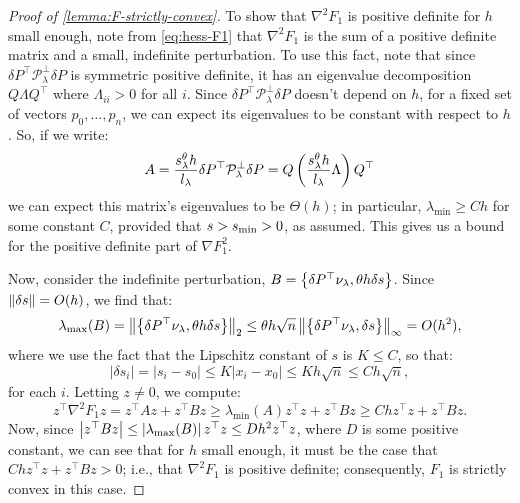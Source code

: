 \documentclass[eikonal.tex]{subfiles}
\begin{document}
\begin{proof}[Proof of \cref{lemma:F-strictly-convex}]
  To show that $\nabla^2 F_1$ is positive definite for $h$ small
  enough, note from \cref{eq:hess-F1} that $\nabla^2 F_1$ is the sum
  of a positive definite matrix and a small, indefinite
  perturbation. To use this fact, note that since
  $\delta P^\top \mathcal{P}^\perp_\lambda \delta P$ is symmetric
  positive definite, it has an eigenvalue decomposition
  $Q \Lambda Q^\top$ where $\Lambda_{ii} > 0$ for all $i$. Since
  $\delta P^\top \mathcal{P}^\perp_\lambda \delta P$ doesn't depend on
  $h$, for a fixed set of vectors $p_0, \hdots, p_n$, we can expect
  its eigenvalues to be constant with respect to $h$. So, if we write:
  \begin{equation}
    A = \frac{s^\theta_\lambda h}{l_\lambda} \delta P^\top \mathcal{P}^\perp_\lambda \delta P = Q \left(\frac{s^\theta_\lambda h}{l_\lambda} \Lambda\right) Q^\top
  \end{equation}
  we can expect this matrix's eigenvalues to be $\Theta(h)$; in
  particular, $\lambda_{\min} \geq C h$ for some constant $C$,
  provided that $s > s_{\operatorname{min}} > 0$, as assumed. This gives us a bound for
  the positive definite part of $\nabla F_1^2$.

  Now, consider the indefinite perturbation,
  $B = \left\{\delta P^\top \nu_\lambda, \theta h \delta s\right\}$. Since
  $\left\|\delta s\right\| = O(h)$, we find that:
  \begin{equation}
    \lambda_{\max}(B) = \left\|\left\{\delta P^\top \nu_\lambda,
        \theta h \delta s\right\}\right\|_2 \leq \theta h \sqrt{n} \left\|\left\{\delta P^\top \nu_\lambda, \delta s\right\}\right\|_\infty = O(h^2),
  \end{equation}
  where we use the fact that the Lipschitz constant of $s$ is
  $K \leq C$, so that:
  \begin{equation}
    |\delta s_i| = |s_i - s_0| \leq K |x_i - x_0| \leq K h \sqrt{n}
    \leq Ch \sqrt{n},
  \end{equation}
  for each $i$. Letting $z \neq 0$, we compute:
  \begin{equation}
    z^\top \nabla^2 F_1 z = z^\top A z + z^\top B z \geq \lambda_{\min}(A) z^\top z + z^\top B z \geq Ch z^\top z + z^\top B z.
  \end{equation}
  Now, since
  $\left|z^\top B z\right| \leq \left|\lambda_{\max}(B)\right| z^\top z \leq D h^2
  z^\top z$, where $D$ is some positive constant, we can see that for
  $h$ small enough, it must be the case that
  $Ch z^\top z + z^\top B z > 0$; i.e., that $\nabla^2 F_1$ is
  positive definite; consequently, $F_1$ is strictly convex in this case.
\end{proof}
\end{document}
